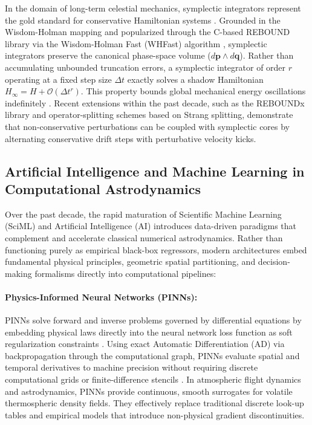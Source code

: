 In the domain of long-term celestial mechanics, symplectic integrators represent the gold standard for conservative Hamiltonian systems \cite{sanz-serna_symplectic_1992}. Grounded in the Wisdom-Holman mapping and popularized through the C-based REBOUND library \cite{ReinLiu2012} via the Wisdom-Holman Fast (WHFast) algorithm \cite{rein_whfast_2015}, symplectic integrators preserve the canonical phase-space volume ($d\mathbf{p} \wedge d\mathbf{q}$). Rather than accumulating unbounded truncation errors, a symplectic integrator of order $r$ operating at a fixed step size $\Delta t$ exactly solves a shadow Hamiltonian $H_\infty = H + \mathcal{O}(\Delta t^r)$. This property bounds global mechanical energy oscillations indefinitely \cite{sanz-serna_symplectic_1992, rein_whfast_2015}. Recent extensions within the past decade, such as the REBOUNDx library and operator-splitting schemes based on Strang splitting, demonstrate that non-conservative perturbations can be coupled with symplectic cores by alternating conservative drift steps with perturbative velocity kicks.

\subsection{Artificial Intelligence and Machine Learning in Computational Astrodynamics}
\label{sec:sota_ai}

Over the past decade, the rapid maturation of Scientific Machine Learning (SciML) and Artificial Intelligence (AI) introduces data-driven paradigms that complement and accelerate classical numerical astrodynamics. Rather than functioning purely as empirical black-box regressors, modern architectures embed fundamental physical principles, geometric spatial partitioning, and decision-making formalisms directly into computational pipelines:

\paragraph{Physics-Informed Neural Networks (PINNs):}
PINNs solve forward and inverse problems governed by differential equations by embedding physical laws directly into the neural network loss function as soft regularization constraints \cite{raissi_physics-informed_2019}. Using exact Automatic Differentiation (AD) via backpropagation through the computational graph, PINNs evaluate spatial and temporal derivatives to machine precision without requiring discrete computational grids or finite-difference stencils \cite{raissi_physics-informed_2019}. In atmospheric flight dynamics and astrodynamics, PINNs provide continuous, smooth surrogates for volatile thermospheric density fields. They effectively replace traditional discrete look-up tables and empirical models that introduce non-physical gradient discontinuities.


